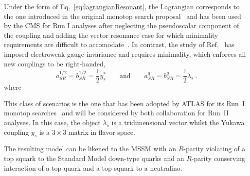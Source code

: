   Under the form of Eq.~\eqref{eq:lagrangianResonant}, the Lagrangian corresponds to the one
  introduced in the original monotop search proposal~\cite{AndreaFuksMaltoni} and has been
  used by the CMS for Run I analyses after neglecting the pseudoscalar component
  of the coupling and adding the vector resonance case for which minimality
  requirements are difficult to accomodate~\cite{CMSmonotop}. In contrast, the
  study of  Ref.~\cite{Boucheneb:2014wza} has imposed electroweak gauge invariance and
  requires minimality, which enforces all new couplings to be right-handed,
  \begin{equation}
  a^{1/2}_{SR} = b^{1/2}_{SR} = \frac12 y_s^*
  \qquad\text{and}\qquad
  a^q_{SR} = b^q_{SR} = \frac12 \lambda_s \ .
  \end{equation}
  where


  This class of scenarios is the one that has been adopted by ATLAS for its
  Run~I monotop searches~\cite{ATLASmonotop} and will be considered by both
  collaboration for Run~II analyses. In this case, the object $\lambda_s$ is a
  tridimensional vector whilst the Yukawa coupling $y_s$ is a $3\times 3$ matrix
  in flavor space.


The resulting model can be likened to the MSSM with an $R$-parity violating of
a top squark to the Standard Model down-type quarks and an $R$-parity
conserving interaction of a top quark and a top-squark to a neutralino.
  

\label{sec:NonResonantProd}

